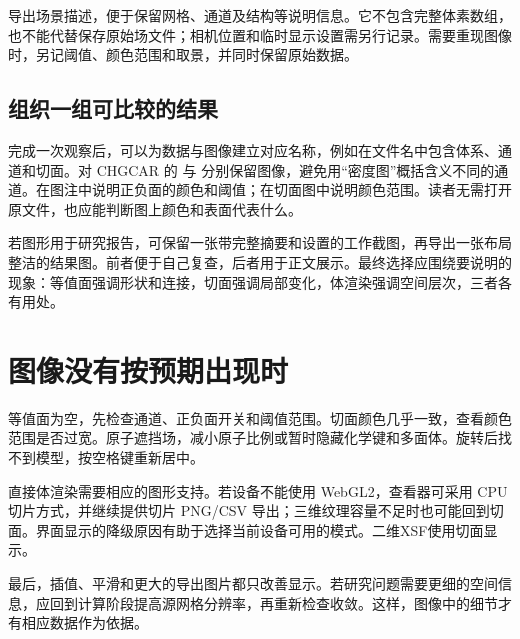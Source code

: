  导出场景描述，便于保留网格、通道及结构等说明信息。它不包含完整体素数组，也不能代替保存原始场文件；相机位置和临时显示设置需另行记录。需要重现图像时，另记阈值、颜色范围和取景，并同时保留原始数据。

\subsection{组织一组可比较的结果}

完成一次观察后，可以为数据与图像建立对应名称，例如在文件名中包含体系、通道和切面。对 CHGCAR 的  与  分别保留图像，避免用“密度图”概括含义不同的通道。在图注中说明正负面的颜色和阈值；在切面图中说明颜色范围。读者无需打开原文件，也应能判断图上颜色和表面代表什么。

若图形用于研究报告，可保留一张带完整摘要和设置的工作截图，再导出一张布局整洁的结果图。前者便于自己复查，后者用于正文展示。最终选择应围绕要说明的现象：等值面强调形状和连接，切面强调局部变化，体渲染强调空间层次，三者各有用处。

\section{图像没有按预期出现时}

等值面为空，先检查通道、正负面开关和阈值范围。切面颜色几乎一致，查看颜色范围是否过宽。原子遮挡场，减小原子比例或暂时隐藏化学键和多面体。旋转后找不到模型，按空格键重新居中。

直接体渲染需要相应的图形支持。若设备不能使用 WebGL2，查看器可采用 CPU 切片方式，并继续提供切片 PNG/CSV 导出；三维纹理容量不足时也可能回到切面。界面显示的降级原因有助于选择当前设备可用的模式。二维XSF使用切面显示。

最后，插值、平滑和更大的导出图片都只改善显示。若研究问题需要更细的空间信息，应回到计算阶段提高源网格分辨率，再重新检查收敛。这样，图像中的细节才有相应数据作为依据。
